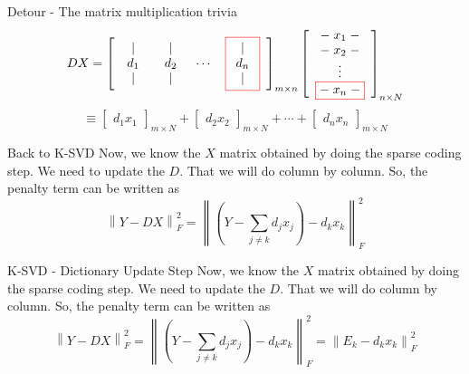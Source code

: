 \documentclass{beamer}
\begin{document}
\begin{frame}{Detour - The matrix multiplication trivia}
    \[
    DX=
    \left[
    \begin{array}{cccc}
    \begin{array}{c}|\\ d_1\\ |\end{array} &
    \begin{array}{c}|\\ d_2\\ |\end{array} &
    \cdots &
    \fcolorbox{red}{white}{$\begin{array}{c}|\\ d_n\\ |\end{array}$}
    \end{array}
    \right]_{m\times n}
    \left[
    \begin{array}{c}
    {-}\;x_1\;{-} \\
    {-}\;x_2\;{-} \\
    \vdots \\
    \fcolorbox{red}{white}{${-}\;x_n\;{-}$}
    \end{array}
    \right]_{n\times N}
    \]
    \[
    \equiv
    \left[\begin{array}{c}d_1x_1\end{array}\right]_{m\times N}
    +
    \left[\begin{array}{c}d_2x_2\end{array}\right]_{m\times N}
    + \cdots +
    \left[\begin{array}{c}d_nx_n\end{array}\right]_{m\times N}
    \]
\end{frame}

\begin{frame}{Back to K-SVD}
Now, we know the $X$ matrix obtained by doing the sparse coding step.
We need to update the $D$. That we will do column by column.
So, the penalty term can be written as
\[
\left\|Y-DX\right\|_F^2
=
\left\|
\left(
Y-\sum_{j\neq k} d_jx_j
\right)-d_kx_k
\right\|_F^2
\]
\end{frame}

\begin{frame}{K-SVD - Dictionary Update Step}
Now, we know the $X$ matrix obtained by doing the sparse coding step.
We need to update the $D$. That we will do column by column.
So, the penalty term can be written as
\[
\left\|Y-DX\right\|_F^2
=
\left\|
\left(
Y-\sum_{j\neq k} d_jx_j
\right)-d_kx_k
\right\|_F^2
=
\left\|E_k-d_kx_k\right\|_F^2
\]
\end{frame}
\end{document}

